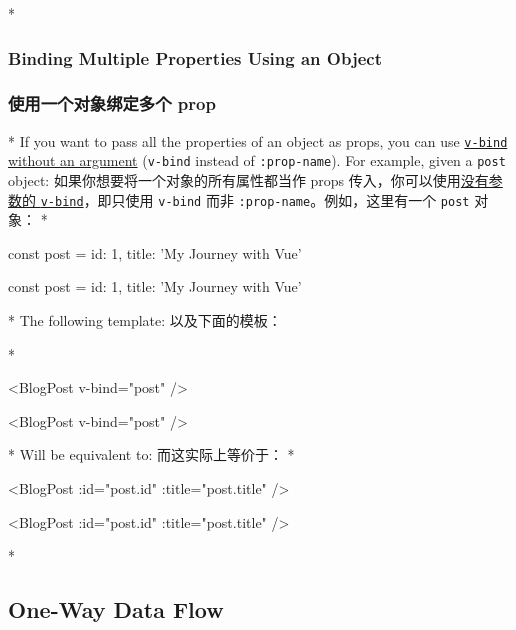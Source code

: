 \begin{paracol}{2}
\switchcolumn[0]*%
\subsubsection{Binding Multiple Properties Using an Object}
\switchcolumn
\subsubsection{使用一个对象绑定多个 prop}
\switchcolumn[0]*%
If you want to pass all the properties of an object as props, you can
use
\href{https://vuejs.org/guide/essentials/template-syntax.html\#dynamically-binding-multiple-attributes}{\texttt{v-bind}
without an argument} (\texttt{v-bind} instead of \texttt{:prop-name}).
For example, given a \texttt{post} object:
\switchcolumn
如果你想要将一个对象的所有属性都当作 props
传入，你可以使用\href{https://cn.vuejs.org/guide/essentials/template-syntax.html\#dynamically-binding-multiple-attributes}{没有参数的
\texttt{v-bind}}，即只使用 \texttt{v-bind} 而非
\texttt{:prop-name}。例如，这里有一个 \texttt{post} 对象：
\switchcolumn[0]*%
\begin{codeJs}
const post = {
  id: 1,
  title: 'My Journey with Vue'
}
\end{codeJs}
\switchcolumn
\begin{codeJs}
const post = {
  id: 1,
  title: 'My Journey with Vue'
}
\end{codeJs}
\switchcolumn[0]*%
The following template:
\switchcolumn
以及下面的模板：

\switchcolumn[0]*%
\begin{codeHtml}
<BlogPost v-bind="post" />
\end{codeHtml}
\switchcolumn
\begin{codeHtml}
<BlogPost v-bind="post" />
\end{codeHtml}
\switchcolumn[0]*%
Will be equivalent to:
\switchcolumn
而这实际上等价于：
\switchcolumn[0]*%
\begin{codeHtml}
<BlogPost :id="post.id" :title="post.title" />
\end{codeHtml}
\switchcolumn
\begin{codeHtml}
<BlogPost :id="post.id" :title="post.title" />
\end{codeHtml}
\switchcolumn[0]*%
\subsection{One-Way Data Flow}
\switchcolumn

\end{paracol}
